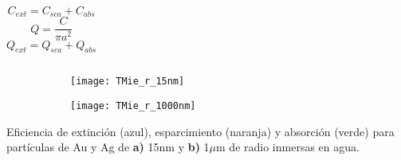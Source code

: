 \documentclass{beamer}
\begin{document}
\begin{frame}
\begin{columns}
	 \centering
$$C_{ext} = C_{sca} + C_{abs}$$
$$Q = \frac{C}{\pi a^2}$$
$$Q_{ext} = Q_{sca} + Q_{abs}$$
	\end{columns}
\vspace*{-.5cm}
\begin{figure}[t!]\centering
	\begin{subfigure}{.01\linewidth}\caption{ } \vspace{2.75cm}\end{subfigure}
	\begin{subfigure}{.45\linewidth}\texttt{[image: TMie\_r\_15nm]}\end{subfigure}	
	\begin{subfigure}{.01\linewidth}\caption{ }\vspace{2.75cm}	\end{subfigure}
	\begin{subfigure}{.45\linewidth}\texttt{[image: TMie\_r\_1000nm]}\end{subfigure}
	\end{figure}
\scriptsize \vspace*{-.5cm}
Eficiencia de extinción (azul), esparcimiento (naranja) y absorción (verde) para partículas de Au y Ag de \textbf{a)} 15nm y \textbf{b)} 1$\mu$m de radio inmersas en agua. 

\end{frame}


\end{document}
